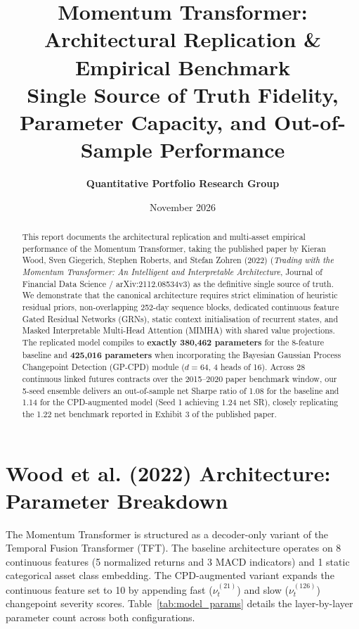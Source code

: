 \documentclass[11pt,a4paper]{article}
\title{\textbf{\LARGE Momentum Transformer: Architectural Replication \& Empirical Benchmark}\\[0.4em]
\large Single Source of Truth Fidelity, Parameter Capacity, and Out-of-Sample Performance}
\author{\textbf{Quantitative Portfolio Research Group}}
\date{November 2026}
\begin{document}
\maketitle

\begin{abstract}
This report documents the architectural replication and multi-asset empirical performance of the Momentum Transformer, taking the published paper by Kieran Wood, Sven Giegerich, Stephen Roberts, and Stefan Zohren (2022) (\textit{Trading with the Momentum Transformer: An Intelligent and Interpretable Architecture}, Journal of Financial Data Science / arXiv:2112.08534v3) as the definitive single source of truth. We demonstrate that the canonical architecture requires strict elimination of heuristic residual priors, non-overlapping 252-day sequence blocks, dedicated continuous feature Gated Residual Networks (GRNs), static context initialisation of recurrent states, and Masked Interpretable Multi-Head Attention (MIMHA) with shared value projections. The replicated model compiles to \textbf{exactly 380,462 parameters} for the 8-feature baseline and \textbf{425,016 parameters} when incorporating the Bayesian Gaussian Process Changepoint Detection (GP-CPD) module ($d = 64$, 4 heads of 16). Across 28 continuous linked futures contracts over the 2015--2020 paper benchmark window, our 5-seed ensemble delivers an out-of-sample net Sharpe ratio of 1.08 for the baseline and 1.14 for the CPD-augmented model (Seed 1 achieving 1.24 net SR), closely replicating the 1.22 net benchmark reported in Exhibit 3 of the published paper.
\end{abstract}

\vspace{1.0em}

\section{Wood et al. (2022) Architecture: Parameter Breakdown}

The Momentum Transformer is structured as a decoder-only variant of the Temporal Fusion Transformer (TFT). The baseline architecture operates on 8 continuous features (5 normalized returns and 3 MACD indicators) and 1 static categorical asset class embedding. The CPD-augmented variant expands the continuous feature set to 10 by appending fast ($\nu_t^{(21)}$) and slow ($\nu_t^{(126)}$) changepoint severity scores. Table~\ref{tab:model_params} details the layer-by-layer parameter count across both configurations.
\end{document}
